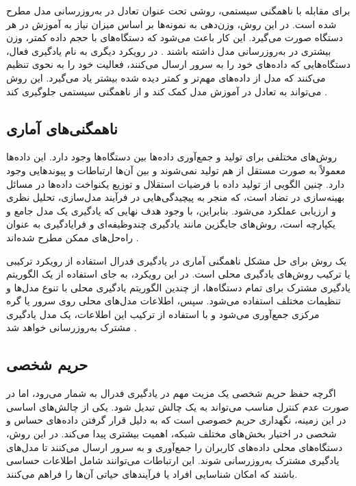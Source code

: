 برای مقابله با ناهمگنی سیستمی، روشی تحت عنوان تعادل در به‌روزرسانی مدل مطرح شده است. در این روش، وزن‌دهی به نمونه‌ها بر اساس میزان نیاز به آموزش در هر دستگاه صورت می‌گیرد. این کار باعث می‌شود که دستگاه‌های با حجم داده کمتر، وزن بیشتری در به‌روزرسانی مدل داشته باشند
\cite{konevcny2015federated}.
در رویکرد دیگری به نام یادگیری فعال، دستگاه‌هایی که داده‌های خود را به سرور ارسال می‌کنند، فعالیت خود را به نحوی تنظیم می‌کنند که مدل از داده‌های مهم‌تر و کمتر دیده شده بیشتر یاد می‌گیرد. این روش می‌تواند به تعادل در آموزش مدل کمک کند و از ناهمگنی سیستمی جلوگیری کند
\cite{konevcny2016federated}.


\subsection{
	ناهمگنی‌های آماری
}
روش‌های مختلفی برای تولید و جمع‌آوری داده‌ها بین دستگاه‌ها وجود دارد. این داده‌ها معمولاً به صورت مستقل از هم تولید نمی‌شوند و بین آن‌ها ارتباطات و پیوندهایی وجود دارد. چنین الگویی از تولید داده با فرضیات استقلال و توزیع یکنواخت داده‌ها%
در مسائل بهینه‌سازی در تضاد است، که منجر به پیچیدگی‌هایی در فرآیند مدل‌سازی، تحلیل نظری و ارزیابی عملکرد می‌شود. بنابراین، با وجود هدف نهایی که یادگیری یک مدل جامع و یکپارچه است، روش‌های جایگزین مانند یادگیری چندوظیفه‌ای%
و فرایادگیری%
به عنوان راه‌حل‌های ممکن مطرح شده‌اند
\cite{li2020federated}.


یک روش برای حل مشکل ناهمگنی آماری در یادگیری فدرال استفاده از رویکرد ترکیبی یا ترکیب روش‌های یادگیری محلی است. در این رویکرد، به جای استفاده از یک الگوریتم یادگیری مشترک برای تمام دستگاه‌ها، از چندین الگوریتم یادگیری محلی با تنوع مدل‌ها و تنظیمات مختلف استفاده می‌شود. سپس، اطلاعات مدل‌های محلی روی سرور یا گره مرکزی جمع‌آوری می‌شود و با استفاده از ترکیب این اطلاعات، یک مدل یادگیری مشترک به‌روزرسانی خواهد شد
\cite{konevcny2015federated}.



\subsection{حریم شخصی}
اگرچه حفظ حریم شخصی یک مزیت مهم در یادگیری فدرال به شمار می‌رود، اما در صورت عدم کنترل مناسب می‌تواند به یک چالش تبدیل شود. یکی از چالش‌های اساسی در این زمینه، نگهداری حریم خصوصی است که به دلیل قرار گرفتن داده‌های حساس و شخصی در اختیار بخش‌های مختلف شبکه، اهمیت بیشتری پیدا می‌کند. در این روش، دستگاه‌های محلی داده‌های کاربران را جمع‌آوری و به سرور ارسال می‌کنند تا مدل‌های یادگیری مشترک به‌روزرسانی شوند. این ارتباطات می‌توانند شامل اطلاعات حساسی باشند که امکان شناسایی افراد یا فرآیندهای حیاتی آن‌ها را فراهم می‌کنند.


